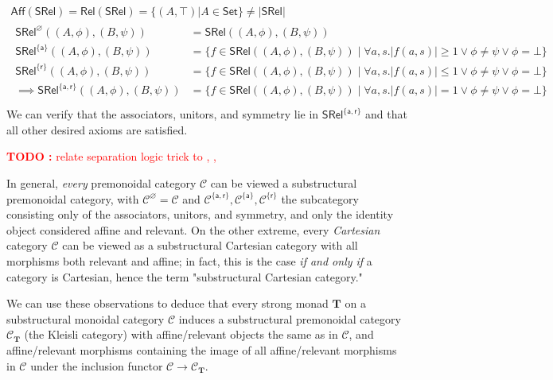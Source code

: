 \documentclass[acmsmall,screen,review]{acmart}
\newcounter{todos}
\newcommand{\TODO}[1]{{
  \stepcounter{todos}
  \begin{center}\large{\textcolor{red}{\textbf{TODO \arabic{todos}:} #1}}\end{center}
}}
\newcommand{\mc}[1]{\ensuremath{\mathcal{#1}}}
\newcommand{\mb}[1]{\ensuremath{\mathbf{#1}}}
\newcommand{\ms}[1]{\ensuremath{\mathsf{#1}}}
\begin{document}
\begin{equation}
  \begin{gathered}
  \ms{Aff}(\ms{SRel}) = \ms{Rel}(\ms{SRel}) = \{(A, \top) | A \in \ms{Set}\} \neq |\ms{SRel}|
  \\
  \begin{aligned}
    \ms{SRel}^\varnothing((A, \phi), (B, \psi))
    &= \ms{SRel}((A, \phi), (B, \psi)) \\
    \ms{SRel}^{\{\ms{a}\}}((A, \phi), (B, \psi)) 
    &= \{f \in \ms{SRel}((A, \phi), (B, \psi)) \mid \forall a, s. |f(a, s)| \geq 1 \lor \phi \neq \psi \lor \phi = \bot \} \\
    \ms{SRel}^{\{\ms{r}\}}((A, \phi), (B, \psi)) 
    &= \{f \in \ms{SRel}((A, \phi), (B, \psi)) \mid \forall a, s. |f(a, s)| \leq 1 \lor \phi \neq \psi \lor \phi = \bot \} \\
    \implies \ms{SRel}^{\{\ms{a}, \ms{r}\}}((A, \phi), (B, \psi)) 
    &= \{f \in \ms{SRel}((A, \phi), (B, \psi)) \mid \forall a, s. |f(a, s)| = 1 \lor \phi \neq \psi \lor \phi = \bot \} \\
  \end{aligned}
  \end{gathered}
\end{equation}
We can verify that the associators, unitors, and symmetry lie in \(\ms{SRel}^{\{\ms{a}, \ms{r}\}}\) and that all other desired axioms are satisfied.

\TODO{relate separation logic trick to \cite{promonad}, \cite{linear-state-usage}, \cite{mellies-ftrs}}

In general, \textit{every} premonoidal category \(\mc{C}\) can be viewed a substructural premonoidal category, with \(\mc{C}^\varnothing = \mc{C}\) and \(\mc{C}^{\{\ms{a}, \ms{r}\}}, \mc{C}^{\{\ms{a}\}}, \mc{C}^{\{\ms{r}\}}\) the subcategory consisting only of the associators, unitors, and symmetry, and only the identity object considered affine and relevant. On the other extreme, every \textit{Cartesian} category \(\mc{C}\) can be viewed as a substructural Cartesian category with all morphisms both relevant and affine; in fact, this is the case \textit{if and only if} a category is Cartesian, hence the term "substructural Cartesian category."

We can use these observations to deduce that every strong monad \(\mb{T}\) on a substructural monoidal category \(\mc{C}\) induces a substructural premonoidal category \(\mc{C}_{\mb{T}}\) (the Kleisli category) with affine/relevant objects the same as in \(\mc{C}\), and affine/relevant morphisms containing the image of all affine/relevant morphisms in \(\mc{C}\) under the inclusion functor \(\mc{C} \to \mc{C}_{\mb{T}}\).
\end{document}

